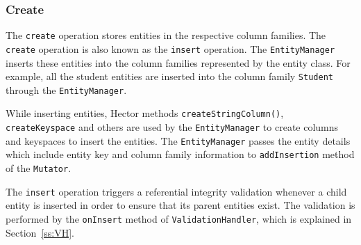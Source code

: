 % 	
		
 	 
	
		\subsubsection{Create}
		 The \texttt{create} operation stores entities in the respective column
		families. The \texttt{create} operation is also known as the
		\texttt{insert} operation. The \texttt{EntityManager} inserts these entities
		into the column families represented by the entity class.  
		For example,  all the student entities are inserted into the column family
		\texttt{Student} through the \texttt{EntityManager}. 
		
		While inserting entities,  Hector methods \texttt{createStringColumn()}, 
		\texttt{createKeyspace} and others are used by the \texttt{EntityManager} to
		create columns and keyspaces to insert the entities. The
		\texttt{EntityManager} passes the entity details which include entity key and
		column family information to \texttt{addInsertion} method of the \texttt{Mutator}.
		
		 The \texttt{insert} operation triggers a referential integrity
		validation whenever a child entity is  inserted in order to ensure that its
		parent entities exist. The validation is performed by the \texttt{onInsert}
		method of \texttt{ValidationHandler}, which is explained in
		Section~\ref{ss:VH}.
		
